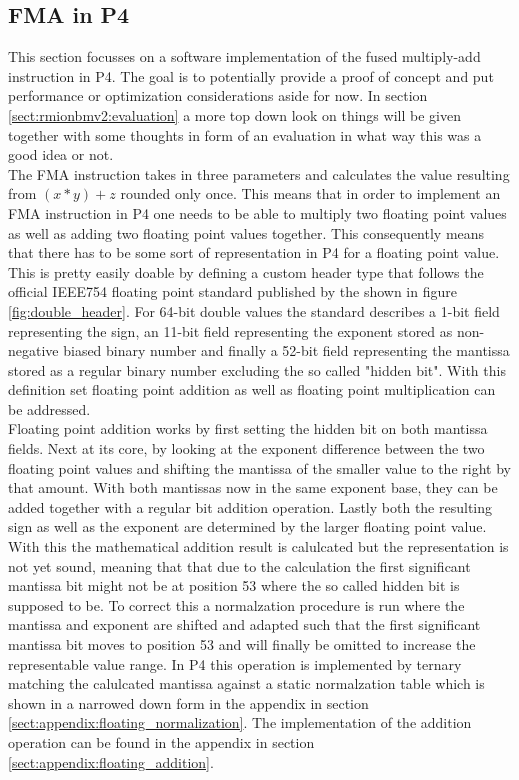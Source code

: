 \subsection{FMA in P4}
This section focusses on a software implementation of the fused multiply-add instruction in P4. The goal is to potentially provide a proof of concept and put performance or optimization considerations aside for now. In section \ref{sect:rmionbmv2:evaluation} a more top down look on things will be given together with some thoughts in form of an evaluation in what way this was a good idea or not.\\

The FMA instruction takes in three parameters and calculates the value resulting from \((x * y) + z\) rounded only once. This means that in order to implement an FMA instruction in P4 one needs to be able to multiply two floating point values as well as adding two floating point values together. This consequently means that there has to be some sort of representation in P4 for a floating point value. This is pretty easily doable by defining a custom header type that follows the official IEEE754 floating point standard published by the \cite{ieee754} shown in figure \ref{fig:double_header}. For 64-bit double values the standard describes a 1-bit field representing the sign, an 11-bit field representing the exponent stored as non-negative biased binary number and finally a 52-bit field representing the mantissa stored as a regular binary number excluding the so called "hidden bit". With this definition set floating point addition as well as floating point multiplication can be addressed.\\

Floating point addition works by first setting the hidden bit on both mantissa fields. Next at its core, by looking at the exponent difference between the two floating point values and shifting the mantissa of the smaller value to the right by that amount. With both mantissas now in the same exponent base, they can be added together with a regular bit addition operation. Lastly both the resulting sign as well as the exponent are determined by the larger floating point value. With this the mathematical addition result is calulcated but the representation is not yet sound, meaning that that due to the calculation the first significant mantissa bit might not be at position 53 where the so called hidden bit is supposed to be. To correct this a normalzation procedure is run where the mantissa and exponent are shifted and adapted such that the first significant mantissa bit moves to position 53 and will finally be omitted to increase the representable value range. In P4 this operation is implemented by ternary matching the calulcated mantissa against a static normalzation table which is shown in a narrowed down form in the appendix in section \ref{sect:appendix:floating_normalization}. The implementation of the addition operation can be found in the appendix in section \ref{sect:appendix:floating_addition}.\\

